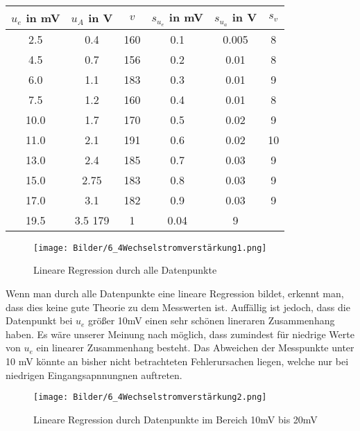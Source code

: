 \begin{table}[h]
    \centering
    \begin{tabular}[h]{c|c|c|c|c|c}


        $u_e$ in mV & $u_A$ in V & $v$ & $s_{u_e}$ in mV&  $s_{u_a}$ in V & $s_v$ \\
       \hline
        2.5 & 0.4 & 160 & 0.1 & 0.005 & 8 \\
        4.5 & 0.7 & 156 & 0.2 & 0.01 & 8\\
        6.0 & 1.1 & 183 & 0.3 & 0.01 & 9\\
        7.5 & 1.2 & 160 & 0.4 & 0.01 & 8\\
        10.0 & 1.7 & 170 & 0.5 & 0.02 & 9\\
        11.0 & 2.1 & 191 & 0.6 & 0.02 & 10\\
        13.0 & 2.4 & 185 & 0.7 & 0.03 & 9\\
        15.0 & 2.75 & 183 & 0.8 & 0.03 & 9\\
        17.0 & 3.1 & 182 & 0.9 & 0.03 & 9\\
        19.5 & 3.5 179 & 1 & 0.04 & 9\\

    \end{tabular}
\end{table}
\begin{figure}[h]
    \centering
    \texttt{[image: Bilder/6\_4Wechselstromverstärkung1.png]}
    \caption{Lineare Regression durch alle Datenpunkte}
\end{figure}
Wenn man durch alle Datenpunkte eine lineare Regression bildet, erkennt man, dass dies keine gute Theorie zu dem Messwerten ist.
Auffällig ist jedoch, dass die Datenpunkt bei $u_e$ größer 10mV einen sehr schönen lineraren Zusammenhang haben. 
Es wäre unserer Meinung nach möglich, dass zumindest für niedrige Werte von $u_e$ ein linearer Zusammenhang besteht. 
Das Abweichen der Messpunkte unter 10 mV könnte an bisher nicht betrachteten Fehlerursachen liegen, welche nur bei niedrigen Eingangsapnnungnen auftreten.
\begin{figure}[h]
    \centering
    \texttt{[image: Bilder/6\_4Wechselstromverstärkung2.png]}
    \caption{Lineare Regression durch Datenpunkte im Bereich 10mV bis 20mV}
\end{figure}
